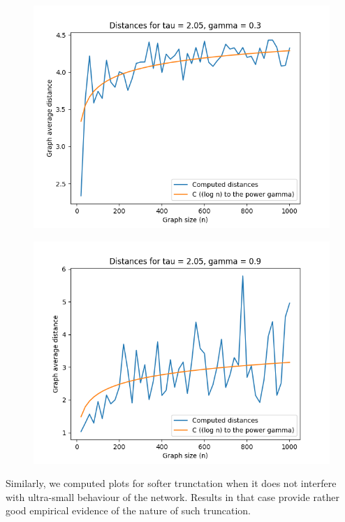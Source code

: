 \documentclass[a4paper]{article}
\begin{document}
\begin{minipage}{80mm}
	\begin{figure}[H]
		\includegraphics[scale=0.5]{log_gamma2_03.png}
		\label{Fig3}
	\end{figure}
\end{minipage}
\begin{minipage}{80mm}
	\begin{figure}[H]
		\includegraphics[scale=0.5]{log_gamma2_09.png}
		\label{Fig4}
	\end{figure}
\end{minipage}

Similarly, we computed plots for softer trunctation when it does not interfere with ultra-small behaviour of the network. Results in that case provide rather good empirical evidence of the nature of such truncation.
\end{document}
